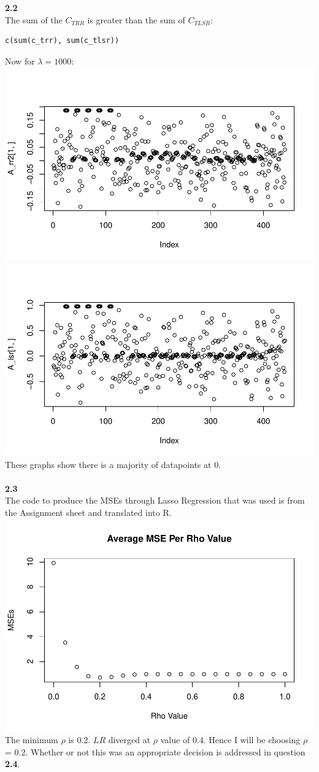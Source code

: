 \documentclass[11pt]{article}
\begin{document}
\textbf{2.2}\\
The sum of the $C_{TRR}$ is greater than the sum of $C_{TLSR}$:
\begin{lstlisting}
c(sum(c_trr), sum(c_tlsr))
\end{lstlisting}
\begin{alltt}

\end{alltt}
Now for $\lambda = 1000$:\\
\includegraphics[width=.45\linewidth]{plots/2_2_Arr.pdf}
\includegraphics[width=.45\linewidth]{plots/2_2_A_lsr.pdf}\\
These graphs show there is a majority of datapoints at 0.\\\\
\textbf{2.3}\\
The code to produce the MSEs through Lasso Regression that was used is from the Assignment sheet and translated into R.\\
\includegraphics[width=.65\linewidth]{plots/2_3_rho_min_is_0_2.pdf}\\
The minimum $\rho$ is $0.2$. $LR$ diverged at $\rho$ value of $0.4$. Hence I will be choosing $\rho$ = $0.2$. Whether or not this was an appropriate decision is addressed in question \textbf{2.4}.\\
\end{document}

